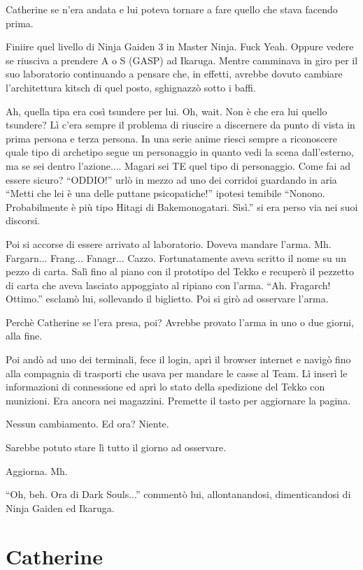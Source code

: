     Catherine se n'era andata e lui poteva tornare a fare quello che stava facendo prima.

    Finiire quel livello di Ninja Gaiden 3 in Master Ninja. Fuck Yeah. Oppure vedere se riusciva a prendere A o S (GASP)
    ad Ikaruga. Mentre camminava in giro per il suo laboratorio
    continuando a pensare che, in effetti, avrebbe dovuto cambiare l'architettura kitsch di quel posto, sghignazzò sotto
    i baffi.

    Ah, quella tipa era così tsundere per lui. Oh, wait. Non è che era lui quello tsundere? Lì c'era sempre il problema
    di riuscire a discernere da punto di vista in prima persona e terza persona. In una serie anime riesci sempre a
    riconoscere quale tipo di archetipo segue un personaggio in quanto vedi la scena dall'esterno, ma se sei dentro
    l'azione.... Magari sei TE quel tipo di personaggio. Come fai ad essere sicuro? ``ODDIO!'' urlò in mezzo ad uno dei
    corridoi guardando in aria ``Metti che lei è una delle puttane psicopatiche!'' ipotesi temibile ``Nonono.
    Probabilmente è più tipo Hitagi di Bakemonogatari. Sìsì.'' si era perso via nei suoi discorsi.

    Poi si accorse di essere arrivato al laboratorio. Doveva mandare l'arma. Mh. Fargarn... Frang... Fanagr... Cazzo.
    Fortunatamente aveva scritto il nome su un pezzo di carta. Salì fino al piano con il prototipo del Tekko e recuperò
    il pezzetto di carta che aveva lasciato appoggiato al ripiano con l'arma. ``Ah. Fragarch! Ottimo.'' esclamò lui,
    sollevando il biglietto. Poi si girò ad osservare l'arma.

    Perchè Catherine se l'era presa, poi? Avrebbe provato l'arma in uno o due giorni, alla fine.

    Poi andò ad uno dei terminali, fece il login, aprì il browser internet e navigò fino alla compagnia di trasporti che
    usava per mandare le casse al Team. Lì inserì le informazioni di connessione ed aprì lo stato della spedizione del
    Tekko con munizioni. Era ancora nei magazzini. Premette il tasto per aggiornare la pagina.

    Nessun cambiamento. Ed ora? Niente.

    Sarebbe potuto stare lì tutto il giorno ad osservare.

    Aggiorna. Mh.

    ``Oh, beh. Ora di Dark Souls...'' commentò lui, allontanandosi, dimenticandosi di Ninja Gaiden ed Ikaruga.

  \section*{Catherine}

